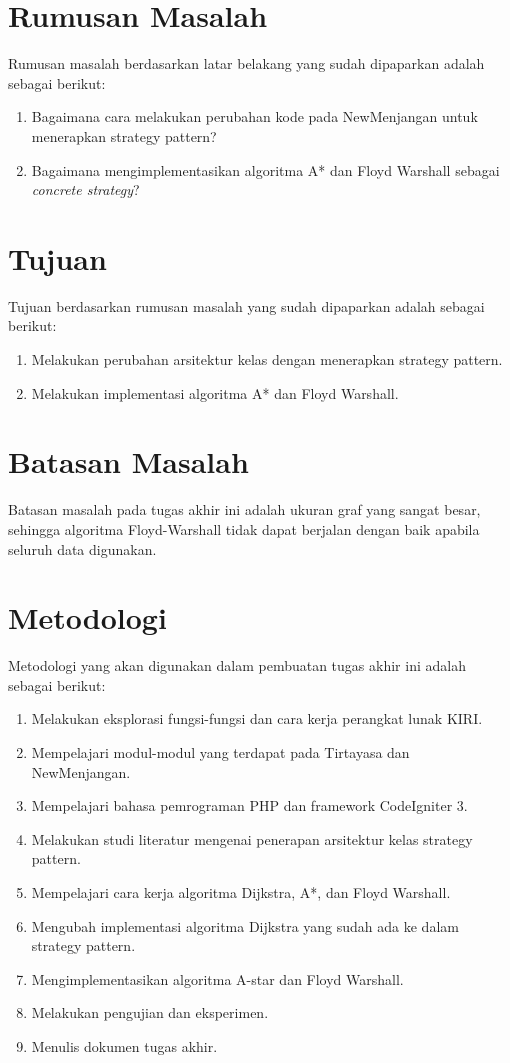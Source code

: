\section{Rumusan Masalah}
\label{sec:rumusan}
Rumusan masalah berdasarkan latar belakang yang sudah dipaparkan adalah sebagai berikut:
\begin{enumerate}
    \item Bagaimana cara melakukan perubahan kode pada NewMenjangan untuk menerapkan strategy pattern?
    \item Bagaimana mengimplementasikan algoritma A* dan Floyd Warshall sebagai \textit{concrete strategy}?
\end{enumerate}

\section{Tujuan}
\label{sec:tujuan}
Tujuan berdasarkan rumusan masalah yang sudah dipaparkan adalah sebagai berikut:
\begin{enumerate}
    \item Melakukan perubahan arsitektur kelas dengan menerapkan strategy pattern.
    \item Melakukan implementasi algoritma A* dan Floyd Warshall.
\end{enumerate}

\section{Batasan Masalah}
\label{sec:batasan}
Batasan masalah pada tugas akhir ini adalah ukuran graf yang sangat besar, sehingga algoritma Floyd-Warshall tidak dapat berjalan dengan baik apabila seluruh data digunakan.

\section{Metodologi}
\label{sec:metlit}
Metodologi yang akan digunakan dalam pembuatan tugas akhir ini adalah sebagai berikut:
	\begin{enumerate}
		\item Melakukan eksplorasi fungsi-fungsi dan cara kerja perangkat lunak KIRI.
		\item Mempelajari modul-modul yang terdapat pada Tirtayasa dan NewMenjangan.
		\item Mempelajari bahasa pemrograman PHP dan framework CodeIgniter 3.
		\item Melakukan studi literatur mengenai penerapan arsitektur kelas strategy pattern.
    		\item Mempelajari cara kerja algoritma Dijkstra, A*, dan Floyd Warshall.
    		\item Mengubah implementasi algoritma Dijkstra yang sudah ada ke dalam strategy pattern.
    		\item Mengimplementasikan algoritma A-star dan Floyd Warshall.
    		\item Melakukan pengujian dan eksperimen.
    		\item Menulis dokumen tugas akhir.
	\end{enumerate}

